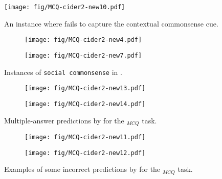 \begin{figure}[ht]
        \texttt{[image: fig/MCQ-cider2-new10.pdf]}
        \caption{An instance where  fails to capture the contextual commonsense cue.}
        \label{fig:mcq10}
\end{figure}
\begin{figure}[t]
\begin{subfigure}[t]{\linewidth}
    \centering
        \texttt{[image: fig/MCQ-cider2-new4.pdf]}
        \caption{}
        \label{fig:mcq4}
\end{subfigure}

\begin{subfigure}[t]{\linewidth}
    \centering
        \texttt{[image: fig/MCQ-cider2-new7.pdf]}
        \caption{}
        \label{fig:mcq7}
\end{subfigure}
\caption{Instances of \texttt{social commonsense} in \dataset{}.}
\label{fig:social_csk_sup}
\end{figure}

\begin{figure}[ht]
\begin{subfigure}[t]{\linewidth}
    \centering
        \texttt{[image: fig/MCQ-cider2-new13.pdf]}
        \caption{}
        \label{fig:mcq13}
\end{subfigure}
\begin{subfigure}[t]{\linewidth}
    \centering
        \texttt{[image: fig/MCQ-cider2-new14.pdf]}
        \caption{}
        \label{fig:mcq14}
\end{subfigure}
\caption{Multiple-answer predictions by  for the \dataset{}$_{MCQ}$ task.}
\end{figure}

\begin{figure}[ht]
\begin{subfigure}[t]{\linewidth}
    \centering
        \texttt{[image: fig/MCQ-cider2-new11.pdf]}
        \label{fig:mcq11}
\end{subfigure}
\begin{subfigure}[t]{\linewidth}
    \centering
        \texttt{[image: fig/MCQ-cider2-new12.pdf]}
        \label{fig:mcq12}
\end{subfigure}
\caption{Examples of some incorrect predictions by  for the \dataset{}$_{MCQ}$ task.}
\label{fig:mcq11-12}
\end{figure}

